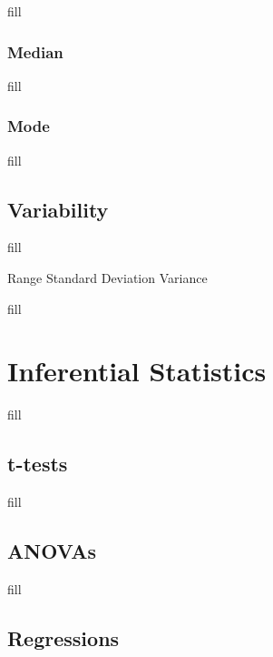 \documentclass[
  b5paper]{book}
\begin{document}
fill

\hypertarget{median}{%
\subsubsection*{Median}\label{median}}

fill

\hypertarget{mode}{%
\subsubsection*{Mode}\label{mode}}

fill

\hypertarget{variability}{%
\subsection*{Variability}\label{variability}}

fill

Range Standard Deviation Variance

fill

\hypertarget{inferential-statistics}{%
\section{Inferential Statistics}\label{inferential-statistics}}

fill

\hypertarget{t-tests}{%
\subsection*{t-tests}\label{t-tests}}

fill

\hypertarget{anovas}{%
\subsection*{ANOVAs}\label{anovas}}

fill

\hypertarget{regressions}{%
\subsection*{Regressions}\label{regressions}}
\end{document}
